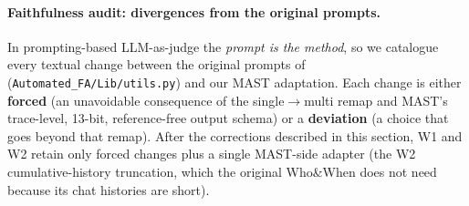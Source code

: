 \paragraph{Faithfulness audit: divergences from the original prompts.}
In prompting-based LLM-as-judge the \emph{prompt is the method}, so we
catalogue every textual change between the original prompts of
\citet{yin2025whoandwhen} (\texttt{Automated\_FA/Lib/utils.py}) and our
MAST adaptation. Each change is either \textbf{forced} (an unavoidable
consequence of the single$\to$multi remap and MAST's trace-level,
13-bit, reference-free output schema) or a \textbf{deviation} (a choice
that goes beyond that remap). After the corrections described in this
section, \textsc{W1} and \textsc{W2} retain only forced changes plus a
single MAST-side adapter (the \textsc{W2} cumulative-history truncation,
which the original Who\&When does not need because its chat histories
are short).

